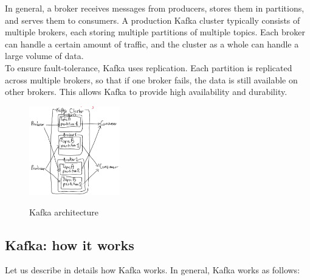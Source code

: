In general, a broker receives messages from producers, stores them in partitions, and serves them to consumers.
A production Kafka cluster typically consists of multiple brokers, each storing multiple partitions of multiple topics.
Each broker can handle a certain amount of traffic, and the cluster as a whole can handle a large volume
of data.\\

To ensure fault-tolerance, Kafka uses replication. Each partition is replicated across multiple brokers, so that
if one broker fails, the data is still available on other brokers. This allows Kafka to provide high availability
and durability.

\begin{figure}[H]
    \centering
    \includegraphics[width=0.35\textwidth]{figures/kafka_brokers.png}
    \label{fig:kafka}
    \caption{Kafka architecture}
\end{figure}

\subsection{Kafka: how it works}

Let us describe in details how Kafka works. In general, Kafka works as follows:

